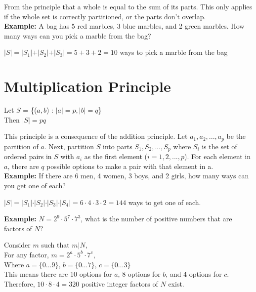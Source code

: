 \documentclass[12pt, letterpaper]{article}
\begin{document}
From the principle that a whole is equal to the sum of its parts. This only applies if the whole set is correctly partitioned, or the parts don't overlap. \\

\textbf{Example:} A bag has 5 red marbles, 3 blue marbles, and 2 green marbles. How many ways can you pick a marble from the bag? \\
\begin{center}
  \(\vert S \vert = \vert S_1 \vert + \vert S_2 \vert + \vert S_3 \vert = 5 + 3 + 2 = 10\) ways to pick a marble from the bag\\
\end{center}

\section*{Multiplication Principle}
\begin{center}
  Let \(S\) = \{(\(a, b\)) : \(\vert a \vert = p, \vert b \vert = q\)\} \\
  Then \(\vert S \vert = pq\)
\end{center}
This principle is a consequence of the addition principle. Let \(a_1, a_2,...,a_p\) be the partition of \(a\). Next, partition \(S\) into parts \(S_1, S_2,..., S_p\) where \(S_i\) is the set of ordered pairs in \(S\) with \(a_i\) as the first element (\(i = 1, 2,..., p\)). For each element in \(a\), there are \(q\) possible options to make a pair with that element in a. \\

\textbf{Example:} If there are 6 men, 4 women, 3 boys, and 2 girls, how many ways can you get one of each? \\
\begin{center}
  \(\vert S \vert = \vert S_1 \vert \cdot \vert S_2 \vert \cdot \vert S_3 \vert \cdot \vert S_4 \vert = 6 \cdot 4 \cdot 3 \cdot 2 = 144\) ways to get one of each.
\end{center}

\textbf{Example:} \(N = 2^9 \cdot 5^7 \cdot 7^3\), what is the number of positive numbers that are factors of \(N\)?

\begin{center}
  Consider \(m\) such that \(m \vert N\), \\
  For any factor, \(m = 2^a \cdot 5^b \cdot 7^c \), \\
  Where \(
    a = \{ 0 \dots 9 \}, \,b =\{0 \dots 7\}, \,c = \{0 \dots 3\}
  \) \\
  This means there are 10 options for \(a\), 8 options for \(b\), and 4 options for \(c\). \\
  Therefore, \(10 \cdot 8 \cdot 4 = 320\) positive integer factors of \(N\) exist.
\end{center}
\end{document}
